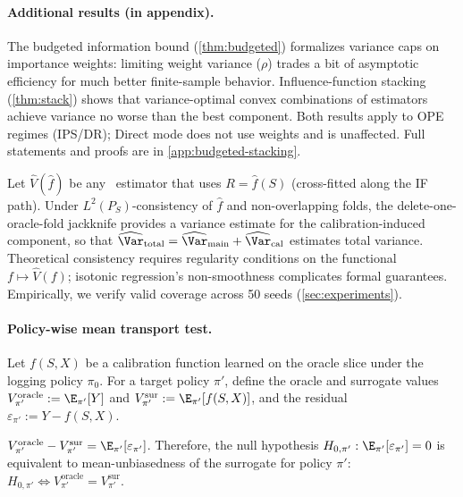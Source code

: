 \paragraph{Additional results (in appendix).}
The budgeted information bound (\cref{thm:budgeted}) formalizes variance caps on importance weights: limiting weight variance ($\rho$) trades a bit of asymptotic efficiency for much better finite-sample behavior. Influence-function stacking (\cref{thm:stack}) shows that variance-optimal convex combinations of estimators achieve variance no worse than the best component. Both results apply to OPE regimes (IPS/DR); Direct mode does not use weights and is unaffected. Full statements and proofs are in \cref{app:budgeted-stacking}.

\begin{prop}
\label{prop:oua}
Let $\widehat V(\hat f)$ be any \CJE\ estimator that uses $R=\hat f(S)$ (cross-fitted along the IF path).
Under $L^2(P_S)$-consistency of $\hat f$ and non-overlapping folds, the delete-one-oracle-fold jackknife provides a variance estimate for the calibration-induced component, so that
$\widehat{\Var}_{\mathrm{total}}=\widehat{\Var}_{\mathrm{main}}+\widehat{\Var}_{\mathrm{cal}}$
estimates total variance.
Theoretical consistency requires regularity conditions on the functional $f\mapsto \widehat V(f)$; isotonic regression's non-smoothness complicates formal guarantees. Empirically, we verify valid coverage across 50 seeds (\cref{sec:experiments}).
\end{prop}

\paragraph{Policy-wise mean transport test.}
Let $f(S,X)$ be a calibration function learned on the oracle slice under the logging policy $\pi_0$. For a target policy $\pi'$, define the oracle and surrogate values
$V_{\pi'}^{\mathrm{oracle}} := \E_{\pi'}[Y]$ and $V_{\pi'}^{\mathrm{sur}} := \E_{\pi'}[f(S,X)]$,
and the residual $\varepsilon_{\pi'} := Y - f(S,X)$.

\begin{prop}
\label{prop:mean-transport}
$V_{\pi'}^{\mathrm{oracle}} - V_{\pi'}^{\mathrm{sur}} = \E_{\pi'}[\varepsilon_{\pi'}]$.
Therefore, the null hypothesis $H_{0,\pi'}: \E_{\pi'}[\varepsilon_{\pi'}] = 0$ is equivalent to mean-unbiasedness of the surrogate for policy $\pi'$: $H_{0,\pi'} \iff V_{\pi'}^{\mathrm{oracle}} = V_{\pi'}^{\mathrm{sur}}$.
\end{prop}

